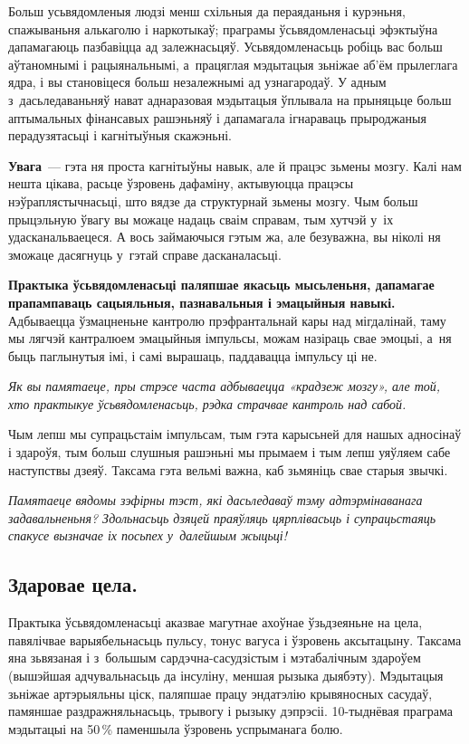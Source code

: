 Больш усьвядомленыя людзі менш схільныя да пераяданьня і курэньня, спажываньня алькаголю і наркотыкаў; праграмы ўсьвядомленасьці эфэктыўна дапамагаюць пазбавіцца ад залежнасьцяў. Усьвядомленасьць робіць вас больш аўтаномнымі і рацыянальнымі, а~працяглая мэдытацыя зьніжае аб'ём прылеглага ядра, і вы становіцеся больш незалежнымі ад узнагародаў. У адным з~дасьледаваньняў нават аднаразовая мэдытацыя ўплывала на прыняцьце больш аптымальных фінансавых рашэньняў і дапамагала ігнараваць прыроджаныя перадузятасьці і кагнітыўныя скажэньні.

\textbf{Увага}~--- гэта ня проста кагнітыўны навык, але й працэс зьмены мозгу. Калі нам нешта цікава, расьце ўзровень дафаміну, актывуюцца працэсы нэўраплястычнасьці, што вядзе да структурнай зьмены мозгу. Чым больш прыцэльную ўвагу вы можаце надаць сваім справам, тым хутчэй у~іх удасканальваецеся. А вось займаючыся гэтым жа, але безуважна, вы ніколі ня зможаце дасягнуць у~гэтай справе дасканаласьці.

\textbf{Практыка ўсьвядомленасьці паляпшае якасьць мысьленьня, дапамагае прапампаваць сацыяльныя, пазнавальныя і эмацыйныя навыкі.} Адбываецца ўзмацненьне кантролю прэфрантальнай кары над мігдалінай, таму мы лягчэй кантралюем эмацыйныя імпульсы, можам назіраць свае эмоцыі, а~ня быць паглынутыя імі, і самі вырашаць, паддавацца імпульсу ці не.

\emph{Як вы памятаеце, пры стрэсе часта адбываецца «крадзеж мозгу», але той, хто практыкуе ўсьвядомленасьць, рэдка страчвае кантроль над сабой.}

Чым лепш мы супрацьстаім імпульсам, тым гэта карысьней для нашых адносінаў і здароўя, тым больш слушныя рашэньні мы прымаем і тым лепш уяўляем сабе наступствы дзеяў. Таксама гэта вельмі важна, каб зьмяніць свае старыя звычкі. 

\emph{Памятаеце вядомы зэфірны тэст, які дасьледаваў тэму адтэрмінаванага задавальненьня? Здольнасьць дзяцей праяўляць цярплівасьць і супрацьстаяць спакусе вызначае іх посьпех у~далейшым жыцьці!}

\subsection*{Здаровае цела.}

Практыка ўсьвядомленасьці аказвае магутнае ахоўнае ўзьдзеяньне на цела, павялічвае варыябельнасьць пульсу, тонус вагуса і ўзровень аксытацыну. Таксама яна зьвязаная і з~большым сардэчна-сасудзістым і мэтабалічным здароўем (вышэйшая адчувальнасьць да інсуліну, меншая рызыка дыябэту). Мэдытацыя зьніжае артэрыяльны ціск, паляпшае працу эндатэлію крывяносных сасудаў, памяншае раздражняльнасьць, трывогу і рызыку дэпрэсіі. 10-тыднёвая праграма мэдытацыі на 50\,\% паменшыла ўзровень успрыманага болю.

